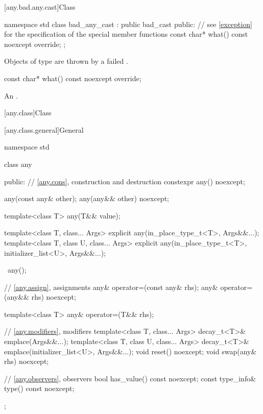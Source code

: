 [any.bad.any.cast]{Class }

%
\begin{codeblock}
namespace std {
  class bad_any_cast : public bad_cast {
  public:
    // see \ref{exception} for the specification of the special member functions
    const char* what() const noexcept override;
  };
}
\end{codeblock}

\pnum
Objects of type  are thrown by a failed .

%
\begin{itemdecl}
const char* what() const noexcept override;
\end{itemdecl}

\begin{itemdescr}
\pnum
\returns
An  \ntbs{}.
\end{itemdescr}

[any.class]{Class }

[any.class.general]{General}

\begin{codeblock}
namespace std {
  class any {
  public:
    // \ref{any.cons}, construction and destruction
    constexpr any() noexcept;

    any(const any& other);
    any(any&& other) noexcept;

    template<class T>
      any(T&& value);

    template<class T, class... Args>
      explicit any(in_place_type_t<T>, Args&&...);
    template<class T, class U, class... Args>
      explicit any(in_place_type_t<T>, initializer_list<U>, Args&&...);

    ~any();

    // \ref{any.assign}, assignments
    any& operator=(const any& rhs);
    any& operator=(any&& rhs) noexcept;

    template<class T>
      any& operator=(T&& rhs);

    // \ref{any.modifiers}, modifiers
    template<class T, class... Args>
      decay_t<T>& emplace(Args&&...);
    template<class T, class U, class... Args>
      decay_t<T>& emplace(initializer_list<U>, Args&&...);
    void reset() noexcept;
    void swap(any& rhs) noexcept;

    // \ref{any.observers}, observers
    bool has_value() const noexcept;
    const type_info& type() const noexcept;
  };
}
\end{codeblock}

